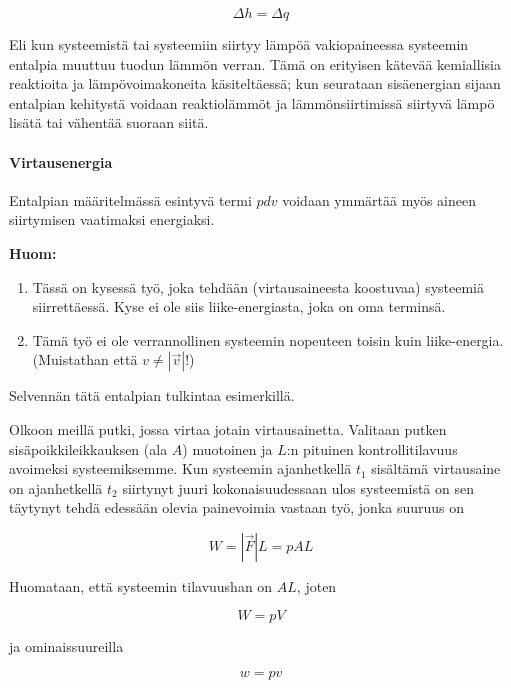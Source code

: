 \documentclass[12pt,a4paper,finnish]{book}
\begin{document}
\begin{equation}
 \Delta h = \Delta q
\end{equation}

Eli kun systeemistä tai systeemiin siirtyy lämpöä vakiopaineessa systeemin entalpia muuttuu tuodun lämmön verran. Tämä 
on erityisen kätevää kemiallisia reaktioita ja lämpövoimakoneita käsiteltäessä; kun seurataan sisäenergian sijaan 
entalpian kehitystä voidaan reaktiolämmöt ja lämmönsiirtimissä siirtyvä lämpö lisätä tai vähentää suoraan siitä.

\paragraph{Virtausenergia}

Entalpian määritelmässä esintyvä termi $pdv$ voidaan ymmärtää myös aineen siirtymisen vaatimaksi energiaksi. 

\textbf{Huom:}

\begin{enumerate}
 \item Tässä on kysessä työ, joka tehdään (virtausaineesta koostuvaa) systeemiä siirrettäessä. Kyse ei ole siis liike-energiasta, 
  joka on oma terminsä.
 \item Tämä työ ei ole verrannollinen systeemin nopeuteen toisin kuin liike-energia. (Muistathan että $v \neq \left|\vec{v}\right|$!)
\end{enumerate}

Selvennän tätä entalpian tulkintaa esimerkillä.

Olkoon meillä putki, jossa virtaa jotain virtausainetta. Valitaan putken sisäpoikkileikkauksen (ala $A$) muotoinen ja $L$:n 
pituinen kontrollitilavuus avoimeksi systeemiksemme. Kun systeemin ajanhetkellä $t_1$ sisältämä virtausaine on 
ajanhetkellä $t_2$ siirtynyt juuri kokonaisuudessaan ulos systeemistä on sen täytynyt tehdä edessään olevia 
painevoimia vastaan työ, jonka suuruus on

\begin{equation}
 W = |\vec{F}| L = pAL
\end{equation}

Huomataan, että systeemin tilavuushan on $AL$, joten

\begin{equation}
 W = pV
\end{equation}

ja ominaissuureilla 

\begin{equation}
 w = pv
\end{equation}
\end{document}
